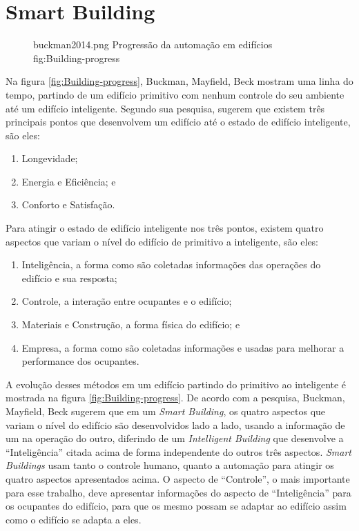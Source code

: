 \section{Smart Building}
\begin{figure}[h!]
    {buckman2014.png}                 %
    {Progressão da automação em edifícios}     %
    {fig:Building-progress}                      %
\end{figure}
Na figura \ref{fig:Building-progress}, Buckman, Mayfield, Beck mostram uma linha do tempo, partindo de um edifício primitivo com nenhum controle do seu ambiente até um edifício inteligente. Segundo sua pesquisa, sugerem que existem três principais pontos que desenvolvem um edifício até o estado de edifício inteligente, são eles:
\begin{enumerate}
    \item Longevidade;
    \item Energia e Eficiência; e
    \item Conforto e Satisfação.
\end{enumerate}
Para atingir o estado de edifício inteligente nos três pontos, existem quatro aspectos que variam o nível do edifício de primitivo a inteligente, são eles:
\begin{enumerate}
    \item Inteligência, a forma como são coletadas informações das operações do edifício e sua resposta;
    \item Controle, a interação entre ocupantes e o edifício;
    \item Materiais e Construção, a forma física do edifício; e
    \item Empresa, a forma como são coletadas informações e usadas para melhorar a performance dos ocupantes.
\end{enumerate}
A evolução desses métodos em um edifício partindo do primitivo ao inteligente é mostrada na figura \ref{fig:Building-progress}.
De acordo com a pesquisa, Buckman, Mayfield, Beck sugerem que em um \emph{Smart Building}, os quatro aspectos que variam o nível do edifício são desenvolvidos lado a lado, usando a informação de um na operação do outro, diferindo de um \emph{Intelligent Building} que desenvolve a ``Inteligência'' citada acima de forma independente do outros três aspectos. \emph{Smart Buildings} usam tanto o controle humano, quanto a automação para atingir os quatro aspectos apresentados acima. O aspecto de ``Controle'', o mais importante para esse trabalho, deve apresentar informações do aspecto de ``Inteligência'' para os ocupantes do edifício, para que os mesmo possam se adaptar ao edifício assim como o edifício se adapta a eles\cite{Buckman2014}.


